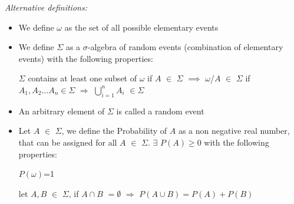 \documentclass[paper=9in:6in,pagesize=pdftex,headinclude=on,footinclude=on,10pt,bibtotoc,pointlessnumbers,normalheadings,DIV=9,twoside=false]{scrbook}
\begin{document}
\begin{large}
\emph{ Alternative definitions:}
\end{large} 
\begin{itemize} 
\item We define $\omega$ as the set of all possible elementary events 

\item We define $\Sigma$ as a $\sigma$-algebra  of random events (combination of elementary events) with the following properties:

\subitem $\Sigma$ contains at least one subset of $\omega$
\subitem if  $A$ $\in$   $\Sigma$ $\implies$ $\omega$/$A$ $\in$ $\Sigma$
\subitem if $A_1, A_2 \dots{} A_n \in \Sigma$  $\Longrightarrow$  $ \bigcup\limits_{i = 1 }^n A_i$ $\in \Sigma$

\item An arbitrary element of $\Sigma$ is called a random event

\item Let $A$ $\in$ $\Sigma$, we define the Probability of $A$ as a non negative real number, that can be assigned for all $A$ $\in$ $\Sigma$. $\exists$ $P(A)$$\geq0 $ with the following properties:

\subitem $ P(\omega)$=1 

\subitem  let $A,B$ $\in$   $\Sigma$, if $A \cap B$ $= \emptyset$ $\Longrightarrow$ $ P(A\cup B) = P(A) + P(B) $ 


\end{itemize}
\end{document}
